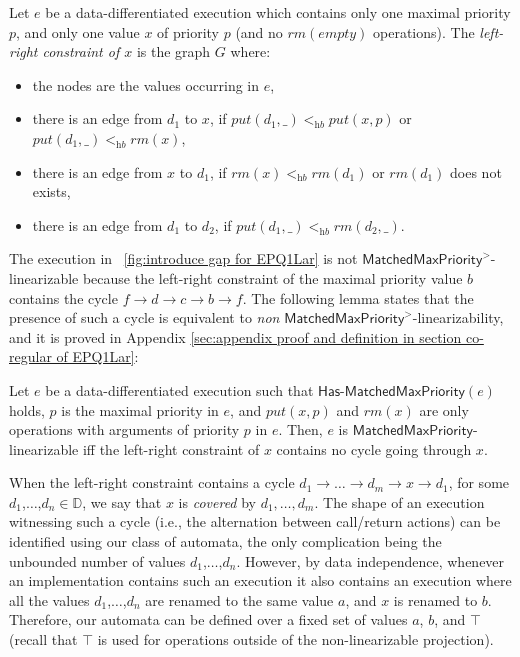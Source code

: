 \begin{definition}\label{def:left-right constraint for matched put and rm operations}
Let $e$ be a data-differentiated execution which contains only one maximal priority $p$, and only one value $x$ of priority $p$ (and no $\textit{rm}(\textit{empty})$ operations).
The \emph{left-right constraint of $x$} is the graph $G$ where:
\begin{itemize}
\item the nodes are the values occurring in $e$,
\item there is an edge from $d_1$ to $x$, if $\textit{put}(d_1,\_) <_{\textit{hb}} \textit{put}(x,p)$ or $\textit{put}(d_1,\_) <_{\textit{hb}} \textit{rm}(x)$,
\item there is an edge from $x$ to $d_1$, if $\textit{rm}(x)<_{\textit{hb}}\textit{rm}(d_1)$ or $\textit{rm}(d_1)$ does not exists,
\item there is an edge from $d_1$ to $d_2$, if $\textit{put}(d_1,\_) <_{\textit{hb}} \textit{rm}(d_2,\_)$.
\end{itemize}
\end{definition}

The execution in \figurename~\ref{fig:introduce gap for EPQ1Lar} is not $\mathsf{MatchedMaxPriority}^>$-linearizable because the left-right constraint of the maximal priority value $b$ contains the cycle $f \rightarrow d \rightarrow c \rightarrow b \rightarrow f$. The following lemma states that the presence of such a cycle is equivalent to \emph{non} $\mathsf{MatchedMaxPriority}^>$-linearizability, and it is proved in Appendix \ref{sec:appendix proof and definition in section co-regular of EPQ1Lar}: 

\begin{lemma}
\label{lemma:Lin Equals Constraint for EPQ1Lar}
Let $e$ be a data-differentiated execution such that
$\mathsf{Has\text{-}MatchedMaxPriority}(e)$ holds, $p$ is the maximal priority in $e$, and $\textit{put}(x,p)$ and $\textit{rm}(x)$ are only operations with arguments of priority $p$ in $e$.
Then, $e$ is $\mathsf{MatchedMaxPriority}$-linearizable iff the left-right constraint of $x$ contains no cycle going through $x$.
\end{lemma}

When the left-right constraint contains a cycle $d_1 \rightarrow \ldots \rightarrow d_m \rightarrow x \rightarrow d_1$, for some $d_1$,$\ldots$,$d_n\in \mathbb{D}$, we say that $x$ is \emph{covered} by $d_1,\ldots,d_m$. The shape of an execution witnessing such a cycle (i.e., the alternation between call/return actions) can be identified using our class of automata, the only complication being the unbounded number of values $d_1$,$\ldots$,$d_n$. However, by data independence, whenever an implementation contains such an execution it also contains an execution where all the values $d_1$,$\ldots$,$d_n$ are renamed to the same value $a$, and $x$ is renamed to $b$. Therefore, our automata can be defined over a fixed set of values $a$, $b$, and $\top$ (recall that $\top$ is used for operations outside of the non-linearizable projection).


